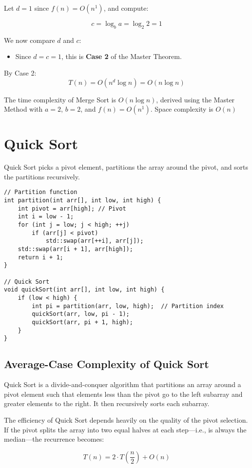 \documentclass{article}
\begin{document}
Let $d = 1$ since $f(n) = O(n^1)$, and compute:

\[
c = \log_b a = \log_2 2 = 1
\]

We now compare $d$ and $c$:
\begin{itemize}
    \item Since $d = c = 1$, this is \textbf{Case 2} of the Master Theorem.
\end{itemize}

By Case 2:
\[
T(n) = O(n^d \log n) = O(n \log n)
\]

The time complexity of Merge Sort is $O(n \log n)$, derived using the Master Method with $a = 2$, $b = 2$, and $f(n) = O(n^1)$.
Space complexity is $O(n)$

\section{Quick Sort}
Quick Sort picks a pivot element, partitions the array around the pivot, and sorts the partitions recursively.

\begin{lstlisting}[style=cppstyle]
// Partition function
int partition(int arr[], int low, int high) {
    int pivot = arr[high]; // Pivot
    int i = low - 1;
    for (int j = low; j < high; ++j)
        if (arr[j] < pivot)
            std::swap(arr[++i], arr[j]);
    std::swap(arr[i + 1], arr[high]);
    return i + 1;
}

// Quick Sort
void quickSort(int arr[], int low, int high) {
    if (low < high) {
        int pi = partition(arr, low, high);  // Partition index
        quickSort(arr, low, pi - 1);
        quickSort(arr, pi + 1, high);
    }
}
\end{lstlisting}

\subsection*{Average-Case Complexity of Quick Sort}

Quick Sort is a divide-and-conquer algorithm that partitions an array around a pivot element such that elements less than the pivot go to the left subarray and greater elements to the right. It then recursively sorts each subarray.

The efficiency of Quick Sort depends heavily on the quality of the pivot selection. If the pivot splits the array into two equal halves at each step—i.e., is always the median—the recurrence becomes:

\[
T(n) = 2 \cdot T\left(\frac{n}{2}\right) + O(n)
\]
\end{document}
